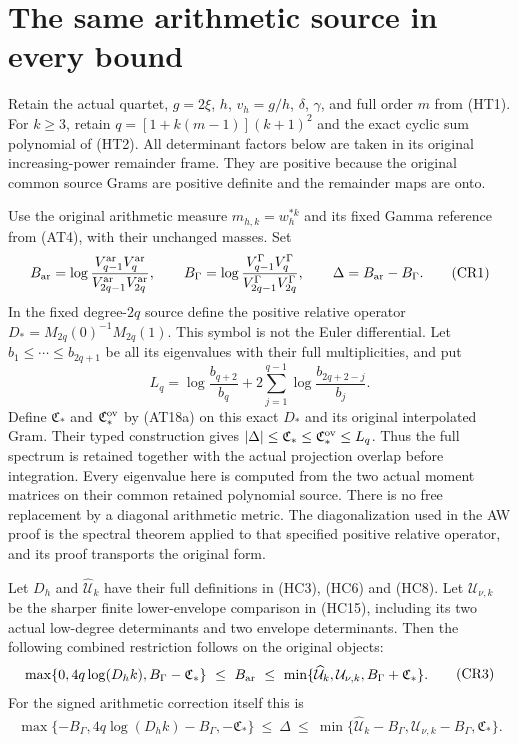 \section{The same arithmetic source in every bound}

Retain the actual quartet, $g=2\xi$, $h$, $v_h=g/h$, $\delta$, $\gamma$,
and full order $m$ from (HT1). For $k\ge3$, retain
$q=[1+k(m-1)](k+1)^2$ and the exact cyclic sum polynomial of (HT2).
All determinant factors below are taken in its original increasing-power
remainder frame. They are positive because the original common source
Grams are positive definite and the remainder maps are onto.

Use the original arithmetic measure $m_{h,k}=w_h^{*k}$ and its fixed
Gamma reference from (AT4), with their unchanged masses. Set
\[
 B_{\rm ar}=\log\frac{V^{\rm ar}_{q-1}V^{\rm ar}_q}
 {V^{\rm ar}_{2q-1}V^{\rm ar}_{2q}},\qquad
 B_\Gamma=\log\frac{V^\Gamma_{q-1}V^\Gamma_q}
 {V^\Gamma_{2q-1}V^\Gamma_{2q}},\qquad
 \Delta=B_{\rm ar}-B_\Gamma.                         \tag{CR1}
\]
In the fixed degree-$2q$ source define the positive relative operator
$D_*=M_{2q}(0)^{-1}M_{2q}(1)$. This symbol is not the Euler differential.
Let $b_1\le\cdots\le b_{2q+1}$ be all its eigenvalues with their full
multiplicities, and put
\[
 L_q=\log\frac{b_{q+2}}{b_q}
 +2\sum_{j=1}^{q-1}\log\frac{b_{2q+2-j}}{b_j}.          \tag{CR2}
\]
Define $\mathfrak C_*$ and $\mathfrak C_*^{\rm ov}$ by
(AT18a) on this exact $D_*$ and its original interpolated Gram.
Their typed construction gives
$|\Delta|\le\mathfrak C_*\le\mathfrak C_*^{\rm ov}\le L_q$.
Thus the full spectrum is retained together with the actual
projection overlap before integration. Every eigenvalue here is computed from the two actual moment matrices
on their common retained polynomial source. There is no free replacement
by a diagonal arithmetic metric. The diagonalization used in the AW proof
is the spectral theorem applied to that specified positive relative
operator, and its proof transports the original form.

Let $D_h$ and $\widehat{\mathcal U}_k$ have their full definitions in
(HC3), (HC6) and (HC8). Let $\mathcal U_{\nu,k}$ be the sharper finite
lower-envelope comparison in (HC15), including its two actual low-degree
determinants and two envelope determinants. Then the following combined
restriction follows on the original objects:
\[
\begin{split}
\max\{0,4q\log(D_hk),B_\Gamma-\mathfrak C_*\}
\ \le\ B_{\rm ar}\ \le\
\min\{\widehat{\mathcal U}_k,\mathcal U_{\nu,k},B_\Gamma+\mathfrak C_*\}.
\end{split}                                                   \tag{CR3}
\]
For the signed arithmetic correction itself this is
\[
\begin{split}
\max\{-B_\Gamma,4q\log(D_hk)-B_\Gamma,-\mathfrak C_*\}
\ \le\ \Delta\ \le\
\min\{\widehat{\mathcal U}_k-B_\Gamma,
       \mathcal U_{\nu,k}-B_\Gamma,\mathfrak C_*\}.
\end{split}                                                   \tag{CR4}
\]

